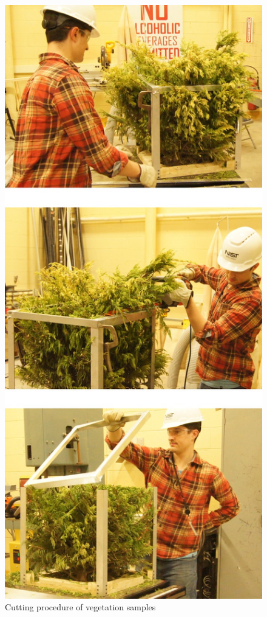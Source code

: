 \documentclass[12pt]{article}
\begin{document}
\begin{figure} [!]
	\centering 	
	\includegraphics[height=\textheight,keepaspectratio]{Picture2.jpg}
	\caption{Cutting procedure of vegetation samples}
	\label{fig:Sampleprep}
\end{figure}
\end{document}
